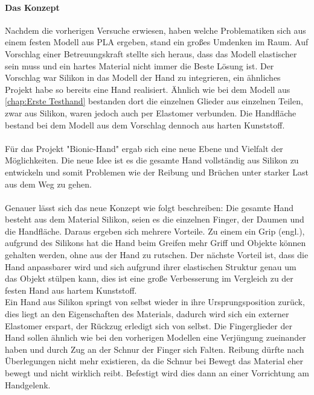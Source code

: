 \documentclass[titlepage,12pt,twoside]{article}
\begin{document}
\paragraph{Das Konzept}
\hfill \break
\hfill \break
Nachdem die vorherigen Versuche erwiesen, haben welche Problematiken sich aus einem festen Modell aus PLA ergeben, stand ein großes Umdenken im Raum. Auf Vorschlag einer Betreuungskraft stellte sich heraus, dass das Modell elastischer sein muss und 
ein hartes Material nicht immer die Beste Lösung ist. Der Vorschlag war Silikon in das Modell der Hand zu integrieren, ein ähnliches Projekt habe so bereits eine Hand realisiert. Ähnlich wie bei dem Modell aus \autoref{chap:Erste Testhand} bestanden 
dort die einzelnen Glieder aus einzelnen Teilen, zwar aus Silikon, waren jedoch auch per Elastomer verbunden. Die Handfläche bestand bei dem Modell aus dem Vorschlag dennoch aus harten Kunststoff. \\
\\
Für das Projekt "Bionic-Hand" ergab sich eine neue Ebene und Vielfalt der Möglichkeiten. Die neue Idee ist es die gesamte Hand vollständig aus Silikon zu entwickeln und somit Problemen wie der Reibung und Brüchen unter starker Last aus dem 
Weg zu gehen. \\
\\
Genauer lässt sich das neue Konzept wie folgt beschreiben: Die gesamte Hand besteht aus dem Material Silikon, seien es die einzelnen Finger, der Daumen und die Handfläche. Daraus ergeben sich mehrere Vorteile. Zu einem ein Grip (engl.), aufgrund des 
Silikons hat die Hand beim Greifen mehr Griff und Objekte können gehalten werden, ohne aus der Hand zu rutschen. Der nächste Vorteil ist, dass die Hand anpassbarer wird und sich aufgrund ihrer elastischen Struktur genau um das Objekt stülpen kann, 
dies ist eine große Verbesserung im Vergleich zu der festen Hand aus hartem Kunststoff. \\
Ein Hand aus Silikon springt von selbst wieder in ihre Ursprungsposition zurück, dies liegt an den Eigenschaften des Materials, dadurch wird sich ein externer Elastomer erspart, der Rückzug erledigt sich von selbst. Die Fingerglieder der Hand sollen 
ähnlich wie bei den vorherigen Modellen eine Verjüngung zueinander haben und durch Zug an der Schnur der Finger sich Falten. Reibung dürfte nach Überlegungen nicht mehr existieren, da die Schnur bei Bewegt das Material eher bewegt und nicht wirklich 
reibt. Befestigt wird dies dann an einer Vorrichtung am Handgelenk. \\
\\
\end{document}
